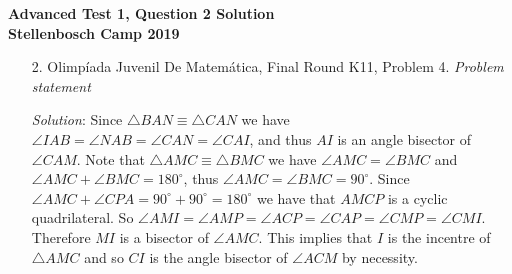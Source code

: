 \documentclass{article}
\begin{document}
\begin{center}
  \textbf{\Large Advanced Test 1, Question 2 Solution}
  \\ \vspace{1em}
  \textbf{\large Stellenbosch Camp 2019}
\end{center}


\begin{enumerate}

\item[2.] Olimp\'iada Juvenil De Matem\'atica, Final Round K11, Problem 4.
\textit{Problem statement}

\textit{Solution}:
Since $\triangle BAN \equiv \triangle CAN$ we have $\angle IAB = \angle NAB = \angle CAN = \angle CAI $, and thus $AI$ is an angle bisector of $\angle CAM$.
Note that $\triangle AMC \equiv \triangle BMC$ we have $\angle AMC = \angle BMC$ and $\angle AMC + \angle BMC =180^\circ$, thus $\angle AMC = \angle BMC = 90^\circ$.
Since $\angle AMC + \angle CPA = 90^\circ +90^\circ =180^\circ$ we have that $AMCP$ is a cyclic quadrilateral.
So $\angle AMI = \angle AMP = \angle ACP = \angle CAP = \angle CMP = \angle CMI$.
Therefore $MI$ is a bisector of $\angle AMC$.
This implies that $I$ is the incentre of $\triangle AMC$ and so $CI$ is the angle bisector of $\angle ACM$ by necessity.


\end{enumerate}
\end{document}
